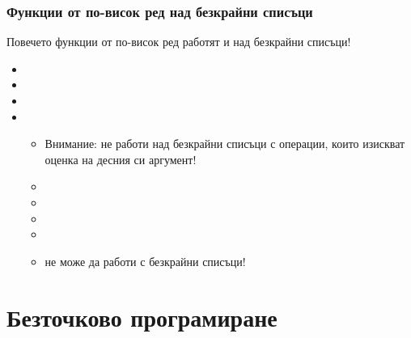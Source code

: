 \documentclass{beamer}
\begin{document}
\begin{frame}
  \frametitle{Функции от по-висок ред над безкрайни списъци}

  Повечето функции от по-висок ред работят и над безкрайни списъци!
  \begin{itemize}[<+->]
  \item {}
  \item {}
  \item {}
  \item {}
    \begin{itemize}
    \item \alert{Внимание:}  не работи над безкрайни списъци с операции, които изискват оценка на десния си аргумент!
    \item {}
    \item {}
    \item {}
    \item {}
    \item \alert{ не може да работи с безкрайни списъци!}
    \end{itemize}
  \end{itemize}
\end{frame}

\section{Безточково програмиране}
\end{document}
